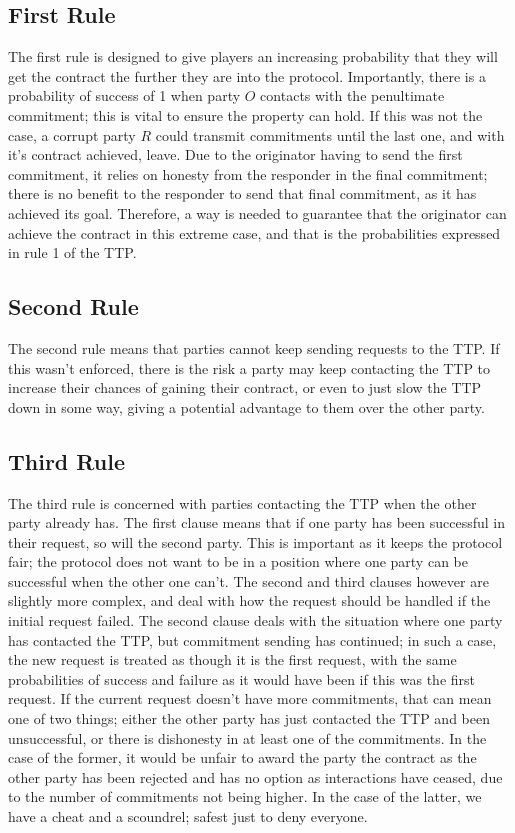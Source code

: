 \documentclass{l4proj}
\begin{document}
\subsection{First Rule}
The first rule is designed to give players an increasing probability that they will get the contract the further they are into the protocol. Importantly, there is a probability of success of 1 when party $O$ contacts with the penultimate commitment; this is vital to ensure the property can hold. If this was not the case, a corrupt party $R$ could transmit commitments until the last one, and with it's contract achieved, leave. Due to the originator having to send the first commitment, it relies on honesty from the responder in the final commitment; there is no benefit to the responder to send that final commitment, as it has achieved its goal. Therefore, a way is needed to guarantee that the originator can achieve the contract in this extreme case, and that is the probabilities expressed in rule 1 of the TTP.

\subsection{Second Rule}
The second rule means that parties cannot keep sending requests to the TTP. If this wasn't enforced, there is the risk a party may keep contacting the TTP  to increase their chances of gaining their contract, or even to just slow the TTP down in some way, giving a potential advantage to them over the other party.

\subsection{Third Rule}
The third rule is concerned with parties contacting the TTP when the other party already has. The first clause means that if one party has been successful in their request, so will the second party. This is important as it keeps the protocol fair; the protocol does not want to be in a position where one party can be successful when the other one can't. The second and third clauses however are slightly more complex, and deal with how the request should be handled if the initial request failed. The second clause deals with the situation where one party has contacted the TTP, but commitment sending has continued; in such a case, the new request is treated as though it is the first request, with the same probabilities of success and failure as it would have been if this was the first request.
If the current request doesn't have more commitments, that can mean one of two things; either the other party has just contacted the TTP and been unsuccessful, or there is dishonesty in at least one of the commitments. In the case of the former, it would be unfair to award the party the contract as the other party has been rejected and has no option as interactions have ceased, due to the number of commitments not being higher. In the case of the latter, we have a cheat and a scoundrel; safest just to deny everyone.
\end{document}
